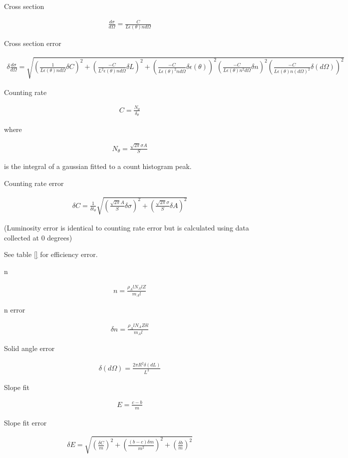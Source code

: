 Cross section

\begin{align}
	\frac{d\sigma}{d\Omega}=\frac{C}{L \epsilon(\theta) n d\Omega}
\end{align}

Cross section error

\begin{align}
\delta \frac{d\sigma}{d\Omega}=\sqrt{
	(\frac{1}{L \epsilon(\theta) n d\Omega} \delta C)^2+
	(\frac{-C}{L^2 \epsilon(\theta) n d \Omega} \delta L)^2+
	(\frac{-C}{L \epsilon(\theta)^2 n d\Omega} \delta \epsilon(\theta))^2
	(\frac{-C}{L \epsilon(\theta) n^2 d\Omega} \delta n)^2
	(\frac{-C}{L \epsilon(\theta) n (d\Omega)^2} \delta (d\Omega))^2
	}
\end{align}

Counting rate

\begin{align}
	C=\frac{N_\theta}{\delta_\theta}
\end{align}

where

\begin{align}
	N_\theta=\frac{\sqrt{2 \pi} \sigma A}{S}
\end{align}

is the integral of a gaussian fitted to a count histogram peak.

Counting rate error

\begin{align}
\delta C = \frac{1}{\delta t_\theta} \sqrt{
	(\frac{\sqrt{2 \pi} A}{S} \delta \sigma)^2+
	(\frac{\sqrt{2 \pi} \sigma}{S} \delta A)^2
}
\end{align}

(Luminosity error is identical to counting rate error but is calculated using data collected at 0 degrees)

See table \ref{} for efficiency error.

n

\begin{align}
	n=\frac{\rho_Al N_A l Z}{m_Al}
\end{align}

n error

\begin{align}
	\delta n = \frac{\rho_Al N_A Z \delta l}{m_Al}
\end{align}

Solid angle error

\begin{align}
	\delta (d\Omega)=
		\frac{2 \pi R^2 \delta (dL)}{L^3}
\end{align}

Slope fit

\begin{align}
	E=\frac{c-b}{m}
\end{align}

Slope fit error

\begin{align}
	\delta E = \sqrt{
	(\frac{\delta C}{m})^2+
	(\frac{(b-c)\delta m}{m^2})^2+
	(\frac{\delta b}{m})^2
	}
\end{align}

